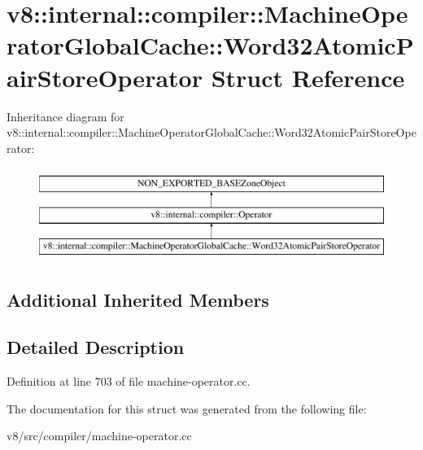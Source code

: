 \hypertarget{structv8_1_1internal_1_1compiler_1_1MachineOperatorGlobalCache_1_1Word32AtomicPairStoreOperator}{}\section{v8\+:\+:internal\+:\+:compiler\+:\+:Machine\+Operator\+Global\+Cache\+:\+:Word32\+Atomic\+Pair\+Store\+Operator Struct Reference}
\label{structv8_1_1internal_1_1compiler_1_1MachineOperatorGlobalCache_1_1Word32AtomicPairStoreOperator}
Inheritance diagram for v8\+:\+:internal\+:\+:compiler\+:\+:Machine\+Operator\+Global\+Cache\+:\+:Word32\+Atomic\+Pair\+Store\+Operator\+:\begin{figure}[H]
\begin{center}
\leavevmode
\includegraphics[height=3.000000cm]{structv8_1_1internal_1_1compiler_1_1MachineOperatorGlobalCache_1_1Word32AtomicPairStoreOperator}
\end{center}
\end{figure}
\subsection*{Additional Inherited Members}


\subsection{Detailed Description}


Definition at line 703 of file machine-\/operator.\+cc.



The documentation for this struct was generated from the following file\+:\begin{DoxyCompactItemize}
\item 
v8/src/compiler/machine-\/operator.\+cc\end{DoxyCompactItemize}
